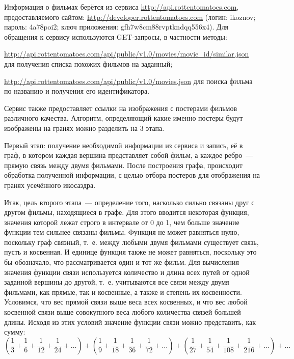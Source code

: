 \documentclass[oneside,final,14pt]{extreport}
\begin{document}
	
Информация о фильмах берётся из сервиса \url{http://api.rottentomatoes.com}, предоставляемого сайтом: \url{http://developer.rottentomatoes.com} (логин: ikoznov; пароль: 4a78poi2; ключ приложения: gfh7w8cm88rvptkndqq556x4). Для обращения к сервису используются GET-запросы, в частности методы:
	
\url{http://api.rottentomatoes.com/api/public/v1.0/movies/movie_id/similar.json} для получения списка похожих фильмов на заданный;

\url{http://api.rottentomatoes.com/api/public/v1.0/movies.json} для поиска фильма по названию и получения его идентификатора.

Сервис также предоставляет ссылки на изображения с постерами фильмов различного качества. Алгоритм, определяющий какие именно постеры будут изображены на гранях можно разделить на 3 этапа.

Первый этап: получение необходимой информации из сервиса и запись, её в граф, в котором каждая вершина представляет собой фильм, а каждое ребро~--- прямую связь между двумя фильмами. После построения графа, происходит обработка полученной информации, с целью отбора постеров для отображения на гранях усечённого икосаэдра.

Итак, цель второго этапа~--- определение того, насколько сильно связаны друг с другом фильмы, находящиеся в графе. Для этого вводится некоторая функция, значения которой лежат строго в интервале от 0 до 1, чем больше значение функции тем сильнее связаны фильмы. Функция не может равняться нулю, поскольку граф связный, т.~е. между любыми двумя фильмами существует связь, пусть и косвенная. И единице функция также не может равняться, поскольку это бы обозначало, что рассматривается один и тот же фильм. Для вычисления значения функции связи используется количество и длина всех путей от одной заданной вершины до другой, т.~е. учитываются все связи между двумя фильмами, как прямые, так и косвенные, а также и степень их косвенности. Условимся, что вес прямой связи выше веса всех косвенных, и что вес любой косвенной связи выше совокупного веса любого количества связей большей длины. Исходя из этих условий значение функции связи можно представить, как сумму:
\begin{dmath*}
\left ( \frac{1}{3} + \frac{1}{6} + \frac{1}{12} + \frac{1}{24} + \ldots \right ) +
\left ( \frac{1}{9} + \frac{1}{18} + \frac{1}{36} + \frac{1}{72} + \ldots \right ) +
\left ( \frac{1}{27} + \frac{1}{54} + \frac{1}{108} + \frac{1}{216} + \ldots \right ) + \ldots
\end{dmath*}
\end{document}
